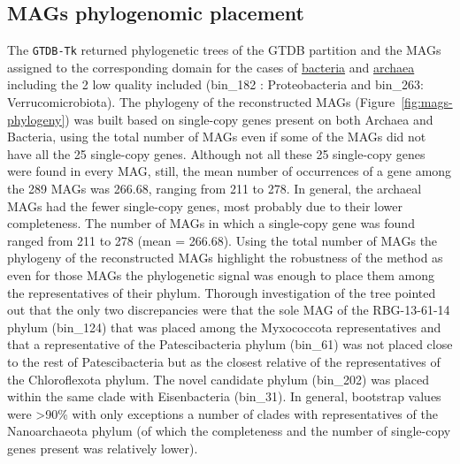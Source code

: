 \subsection{MAGs phylogenomic placement}

   The \texttt{GTDB-Tk} returned phylogenetic trees of the GTDB partition and the MAGs assigned to the corresponding domain for the 
   cases of \href{https://github.com/hariszaf/karpathos-swamp/blob/main/GTDB_TK_bins_classification/elos_70_5.bac120.classify.tree}{bacteria} 
   and \href{https://github.com/hariszaf/karpathos-swamp/blob/main/GTDB_TK_bins_classification/elos_70_5.ar122.classify.tree}{archaea} 
   including the 2 low quality included (bin\_182 : Proteobacteria and bin\_263: Verrucomicrobiota). 
   The phylogeny of the reconstructed MAGs (Figure~\ref{fig:mags-phylogeny}) was built based on single-copy genes present on both Archaea and Bacteria, using the total number of MAGs 
   even if some of the MAGs did not have all the 25 single-copy genes. 
   Although not all these 25 single-copy genes were found in every MAG, still, the mean number of occurrences of a gene among the 289 MAGs was 266.68, ranging from 211 to 278. 
   In general, the archaeal MAGs had the fewer single-copy genes, most probably due to their lower completeness. 
   The number of MAGs in which a single-copy gene was found  ranged from 211 to 278 (mean = 266.68). 
   Using the total number of MAGs the phylogeny of the reconstructed MAGs highlight the robustness of the method as even for those MAGs the phylogenetic signal was enough to place 
   them among the representatives of their phylum. 
   Thorough investigation of the tree pointed out that the only two discrepancies were that the sole MAG of the RBG-13-61-14 phylum (bin\_124) that was placed among the 
   Myxococcota representatives and that a representative of the Patescibacteria phylum (bin\_61) was not placed close to the rest of Patescibacteria but as the closest relative of 
   the representatives of the Chloroflexota phylum. 
   The novel candidate phylum (bin\_202) was placed within the same clade with Eisenbacteria (bin\_31). 
   In general, bootstrap values were >90\% with only exceptions a number of clades with representatives of the Nanoarchaeota phylum 
   (of which the completeness and the number of single-copy genes present was relatively lower). 

